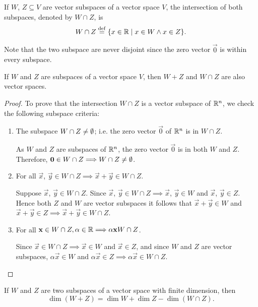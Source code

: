 \begin{prop}
    If $W$, $Z\subseteq V$ are vector subspaces of a vector space $V$, the intersection of both subspaces,
    denoted by $W\cap Z$, is
    \begin{equation}
        W\cap Z \overset{\mathrm{def}}{=} \{x\in \mathbb{R}\; | \; x\in W\wedge x\in Z\}.
    \end{equation}
\end{prop}

\begin{remark}
    Note that the two subspace are never disjoint since the zero vector $\vec{0}$ is within every subspace.
\end{remark}

\begin{lemma}
    If $W$ and $Z$ are subspaces of a vector space $V$, then $W + Z$ and $W\cap Z$ are also vector spaces.
\end{lemma}

\begin{proof}
    To prove that the intersection $W\cap Z$ is a vector subspace of $\mathbb{R}^n$, we check the following subspace
    criteria:

    \begin{enumerate}
        \item The subspace $W\cap Z\neq \emptyset$; i.e. the zero vector $\vec{0}$ of $\mathbb{R}^n$ is in $W\cap Z$.

            As $W$ and $Z$ are subspaces of $\mathbb{R}^n$, the zero vector $\vec{0}$ is in both $W$ and $Z$.
            Therefore, $\mathbf{0}\in W\cap Z\Longrightarrow W\cap Z\neq\emptyset$.

        \item For all $\vec{x}$, $\vec{y}\in W\cap Z\implies \vec{x} + \vec{y}\in W\cap Z$.

            Suppose $\vec{x}$, $\vec{y}\in W\cap Z$. Since $\vec{x}$, $\vec{y}\in W\cap Z\implies \vec{x}$,
            $\vec{y}\in W$ and $\vec{x}$, $\vec{y}\in Z$. Hence both $Z$ and $W$ are vector subspaces it
            follows that $\vec{x} + \vec{y}\in W$ and $\vec{x} + \vec{y}\in Z\implies \vec{x} + \vec{y}\in
            W\cap Z$.

        \item For all $\mathbf{x}\in W\cap Z, \alpha\in\mathbb{R}\Longrightarrow \alpha\mathbf{x} W\cap Z$.

            Since $\vec{x}\in W\cap Z\implies \vec{x}\in W$ and $\vec{x}\in Z$, and since $W$ and $Z$ are
            vector subspaces, $\alpha\vec{x}\in W$ and $\alpha\vec{x}\in Z\implies \alpha\vec{x}\in W\cap Z$.
    \end{enumerate}
\end{proof}

\begin{prop}
    If $W$ and $Z$ are two subspaces of a vector space with finite dimension, then
    \begin{equation}
        \dim\left( W + Z \right) = \dim W + \dim Z - \dim\left( W\cap Z \right).
    \end{equation}
\end{prop}
